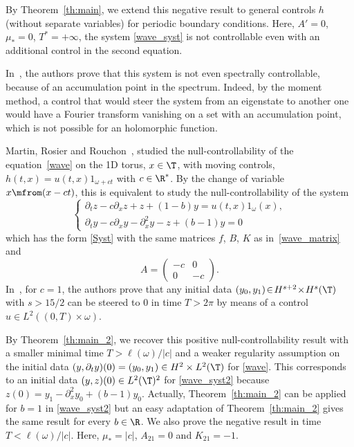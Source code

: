 By Theorem~\ref{th:main}, we extend this negative result to general controls $h$ (\ie without separate variables) for periodic boundary conditions.
Here, $A'=0$, $\mu_*=0$, $T^\ast=+\infty$, the system \eqref{wave_syst} is not controllable even with an additional control in the second equation.

In~\cite{rosier_2007}, the authors prove that this system is not even spectrally controllable, because of an accumulation point in the spectrum.
Indeed, by the moment method, a control that would steer the system from an eigenstate to another one would have a Fourier transform vanishing on a set with an accumulation point, which is not possible for an holomorphic function.

Martin, Rosier and Rouchon~\cite{martin_2013}, studied the null-controllability of the equation~\eqref{wave} on the 1D torus, $x\in\T$, with moving controls, \ie $h(t,x)=u(t,x) 1_{\omega+ct}$ with $c\in\R^*$.
By the change of variable $x \mfrom (x-ct)$, this is equivalent to study the null-controllability of the system
\begin{equation} \label{wave_syst2}
\begin{cases}
\partial_t z-c\partial_x z+z+(1-b)y= u(t,x) 1_{\omega}(x), \\
\partial_t y-c\partial_x y-\partial_x^2y -z + (b-1)y =0
\end{cases}
\end{equation}
which has the form \eqref{Syst} with the same matrices $f$, $B$, $K$ as in~\eqref{wave_matrix} and
\[
A=\begin{pmatrix}
-c & 0 \\ 0 & -c
\end{pmatrix}.
\]
In~\cite[Th.\,1.2]{martin_2013}, for $c\!=\!1$, the authors prove that any initial data \hbox{$(y_0,y_1)\!\in\! H^{s+2}\!\times\! H^{s}(\T)$} with $s>15/2$ can be steered to $0$ in time $T>2\pi$ by means of a control $u\in L^2((0,T)\times\omega)$.

By Theorem~\ref{th:main_2}, we recover this positive null-controllability result with a smaller minimal time $T>\ell(\omega)/|c|$ and a weaker regularity assumption on the initial data $(y,\partial_t y)(0)=(y_0,y_1)\in H^2 \times L^2(\T)$ for \eqref{wave}.
This corresponds to an initial data $(y,z)(0) \in L^2(\T)^2$ for \eqref{wave_syst2} because $z(0)=y_1-\partial_x^2 y_0 + (b-1)y_0$. Actually, Theorem~\ref{th:main_2} can be applied for $b=1$ in \eqref{wave_syst2} but an easy adaptation of Theorem~\ref{th:main_2} gives the same result for every $b \in \R$.
We also prove the negative result in time $T<\ell(\omega)/|c|$. Here, $\mu_*=|c|$, $A_{21}=0$ and $K_{21}=-1$.

